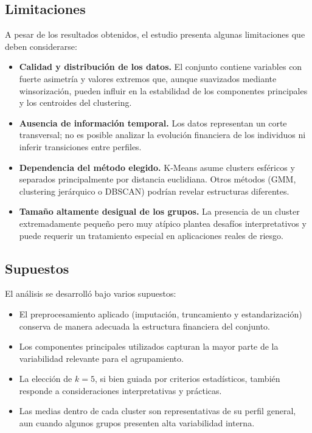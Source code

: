 \documentclass[a4paper,12pt]{article}
\begin{document}
\subsection*{Limitaciones}

A pesar de los resultados obtenidos, el estudio presenta algunas limitaciones que deben considerarse:

\begin{itemize}
    \item \textbf{Calidad y distribución de los datos.} El conjunto contiene variables con fuerte asimetría y valores 
    extremos que, aunque suavizados mediante winsorización, pueden influir en la estabilidad de los componentes principales y los centroides del clustering.
    \item \textbf{Ausencia de información temporal.} Los datos representan un corte transversal; no es posible analizar la evolución financiera de los 
    individuos ni inferir transiciones entre perfiles.
    \item \textbf{Dependencia del método elegido.} K-Means asume clusters esféricos y separados principalmente por distancia euclidiana. 
    Otros métodos (GMM, clustering jerárquico o DBSCAN) podrían revelar estructuras diferentes.
    \item \textbf{Tamaño altamente desigual de los grupos.} La presencia de un cluster extremadamente pequeño pero muy atípico plantea desafíos interpretativos y 
    puede requerir un tratamiento especial en aplicaciones reales de riesgo.
\end{itemize}

\subsection*{Supuestos}

El análisis se desarrolló bajo varios supuestos:

\begin{itemize}
    \item El preprocesamiento aplicado (imputación, truncamiento y estandarización) conserva de manera adecuada la estructura financiera del conjunto.
    \item Los componentes principales utilizados capturan la mayor parte de la variabilidad relevante para el agrupamiento.
    \item La elección de $k=5$, si bien guiada por criterios estadísticos, también responde a consideraciones interpretativas y prácticas.
    \item Las medias dentro de cada cluster son representativas de su perfil general, aun cuando algunos grupos presenten alta variabilidad interna.
\end{itemize}
\end{document}
